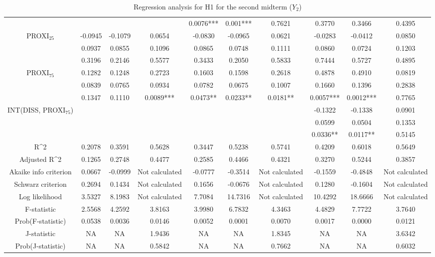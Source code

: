 \documentclass[]{article}
\begin{document}
\begin{landscape}
\begin{table}[htp]
\begin{adjustbox}{height=0.55\textheight,width=1.6\textwidth}
\begin{tabular}{c|ccc|ccc|ccc}
					&  &  &  & 0.0076*** & 0.001*** & 0.7621 & 0.3770 & 0.3466 & 0.4395 \\
					PROXI$_{25}$ & -0.0945 & -0.1079 & 0.0654 & -0.0830 & -0.0965 & 0.0621 & -0.0283 & -0.0412 & 0.0850 \\
					& 0.0937 & 0.0855 & 0.1096 & 0.0865 & 0.0748 & 0.1111 & 0.0860 & 0.0724 & 0.1203 \\
					& 0.3196 & 0.2146 & 0.5577 & 0.3433 & 0.2050 & 0.5833 & 0.7444 & 0.5727 & 0.4895 \\
					PROXI$_{75}$ & 0.1282 & 0.1248 & 0.2723 & 0.1603 & 0.1598 & 0.2618 & 0.4878 & 0.4910 & 0.0819 \\
					& 0.0839 & 0.0765 & 0.0934 & 0.0782 & 0.0675 & 0.1007 & 0.1660 & 0.1396 & 0.2838 \\
					& 0.1347 & 0.1110 & 0.0089*** & 0.0473** & 0.0233** & 0.0181** & 0.0057*** & 0.0012*** & 0.7765 \\
					INT(DISS, PROXI$_{75}$) &  &  &  &  &  &  & -0.1322 & -0.1338 & 0.0901 \\
					&  &  &  &  &  &  & 0.0599 & 0.0504 & 0.1353 \\
					&  &  &  &  &  &  & 0.0336** & 0.0117** & 0.5145 \\
					\hline
					R\^{}2 & 0.2078 & 0.3591 & 0.5628 & 0.3447 & 0.5238 & 0.5741 & 0.4209 & 0.6018 & 0.5649 \\
					Adjusted R\^{}2 & 0.1265 & 0.2748 & 0.4477 & 0.2585 & 0.4466 & 0.4321 & 0.3270 & 0.5244 & 0.3857 \\
					Akaike info criterion & 0.0667 & -0.0999 & Not calculated & -0.0777 & -0.3514 & Not calculated & -0.1559 & -0.4848 & Not calculated \\
					Schwarz criterion & 0.2694 & 0.1434 & Not calculated & 0.1656 & -0.0676 & Not calculated & 0.1280 & -0.1604 & Not calculated \\
					Log likelihood & 3.5327 & 8.1983 & Not calculated & 7.7084 & 14.7316 & Not calculated & 10.4292 & 18.6666 & Not calculated \\
					\hline
					F-statistic & 2.5568 & 4.2592 & 3.8163 & 3.9980 & 6.7832 & 4.3463 & 4.4829 & 7.7722 & 3.7640 \\
					Prob(F-statistic) & 0.0538 & 0.0036 & 0.0146 & 0.0052 & 0.0001 & 0.0070 & 0.0017 & 0.0000 & 0.0121 \\
					J-statistic & NA & NA & 1.9436 & NA & NA & 1.8345 & NA & NA & 3.6342 \\
					Prob(J-statistic) & NA & NA & 0.5842 & NA & NA & 0.7662 & NA & NA & 0.6032 \\
					\hline
				\end{tabular}
			\end{adjustbox}
			\caption{Regression analysis for H1 for the second midterm ($Y_2$)}  
		\end{table} 
	\end{landscape}
\end{document}
